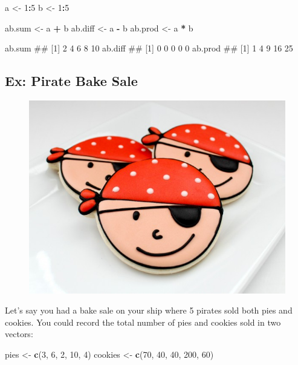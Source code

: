 \documentclass[]{book}
\newenvironment{Shaded}{\begin{snugshade}}{\end{snugshade}}
\newcommand{\KeywordTok}[1]{\textcolor[rgb]{0.13,0.29,0.53}{\textbf{#1}}}
\newcommand{\DecValTok}[1]{\textcolor[rgb]{0.00,0.00,0.81}{#1}}
\newcommand{\StringTok}[1]{\textcolor[rgb]{0.31,0.60,0.02}{#1}}
\newcommand{\OperatorTok}[1]{\textcolor[rgb]{0.81,0.36,0.00}{\textbf{#1}}}
\newcommand{\NormalTok}[1]{#1}
\theoremstyle{definition}
\theoremstyle{definition}
\theoremstyle{remark}
\begin{document}
\begin{Shaded}
\begin{Highlighting}[]
\NormalTok{a <-}\StringTok{ }\DecValTok{1}\OperatorTok{:}\DecValTok{5}
\NormalTok{b <-}\StringTok{ }\DecValTok{1}\OperatorTok{:}\DecValTok{5}

\NormalTok{ab.sum <-}\StringTok{ }\NormalTok{a }\OperatorTok{+}\StringTok{ }\NormalTok{b}
\NormalTok{ab.diff <-}\StringTok{ }\NormalTok{a }\OperatorTok{-}\StringTok{ }\NormalTok{b}
\NormalTok{ab.prod <-}\StringTok{ }\NormalTok{a }\OperatorTok{*}\StringTok{ }\NormalTok{b}

\NormalTok{ab.sum}
\NormalTok{## [1]  2  4  6  8 10}
\NormalTok{ab.diff}
\NormalTok{## [1] 0 0 0 0 0}
\NormalTok{ab.prod}
\NormalTok{## [1]  1  4  9 16 25}
\end{Highlighting}
\end{Shaded}

\subsection{Ex: Pirate Bake Sale}\label{ex-pirate-bake-sale}

\begin{figure}

{\centering \includegraphics[width=0.5\linewidth]{images/piratecookies} 

}

\end{figure}

Let's say you had a bake sale on your ship where 5 pirates sold both
pies and cookies. You could record the total number of pies and cookies
sold in two vectors:

\begin{Shaded}
\begin{Highlighting}[]
\NormalTok{pies <-}\StringTok{ }\KeywordTok{c}\NormalTok{(}\DecValTok{3}\NormalTok{, }\DecValTok{6}\NormalTok{, }\DecValTok{2}\NormalTok{, }\DecValTok{10}\NormalTok{, }\DecValTok{4}\NormalTok{)}
\NormalTok{cookies <-}\StringTok{ }\KeywordTok{c}\NormalTok{(}\DecValTok{70}\NormalTok{, }\DecValTok{40}\NormalTok{, }\DecValTok{40}\NormalTok{, }\DecValTok{200}\NormalTok{, }\DecValTok{60}\NormalTok{)}
\end{Highlighting}
\end{Shaded}
\end{document}

